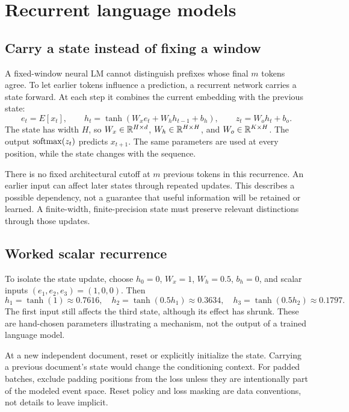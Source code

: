 \clearpage
\section{Recurrent language models}\label{sec:rnn}
\subsection*{Carry a state instead of fixing a window}
A fixed-window neural LM cannot distinguish prefixes whose final $m$
tokens agree. To let earlier tokens influence a prediction, a recurrent
network carries a state forward. At each step it combines the current
embedding with the previous state:
\[
 e_t=E[x_t],\qquad
 h_t=\tanh(W_xe_t+W_hh_{t-1}+b_h),\qquad
 z_t=W_oh_t+b_o.
\]
The state has width $H$, so $W_x\in\mathbb{R}^{H\times d}$,
$W_h\in\mathbb{R}^{H\times H}$, and $W_o\in\mathbb{R}^{K\times H}$.
The output $\operatorname{softmax}(z_t)$ predicts $x_{t+1}$. The same parameters are
used at every position, while the state changes with the sequence.


There is no fixed architectural cutoff at $m$ previous tokens in this
recurrence. An earlier input can affect later states through repeated
updates. This describes a possible dependency, not a guarantee that useful
information will be retained or learned. A finite-width, finite-precision
state must preserve relevant distinctions through those updates.

\subsection*{Worked scalar recurrence}
To isolate the state update, choose $h_0=0$, $W_x=1$, $W_h=0.5$,
$b_h=0$, and scalar inputs $(e_1,e_2,e_3)=(1,0,0)$. Then
\[
 h_1=\tanh(1)\approx0.7616,\quad
 h_2=\tanh(0.5h_1)\approx0.3634,\quad
 h_3=\tanh(0.5h_2)\approx0.1797.
\]
The first input still affects the third state, although its effect has
shrunk. These are hand-chosen parameters illustrating a mechanism, not
the output of a trained language model.

At a new independent document, reset or explicitly initialize the state.
Carrying a previous document's state would change the conditioning context.
For padded batches, exclude padding positions from the loss unless they
are intentionally part of the modeled event space. Reset policy and loss
masking are data conventions, not details to leave implicit.

